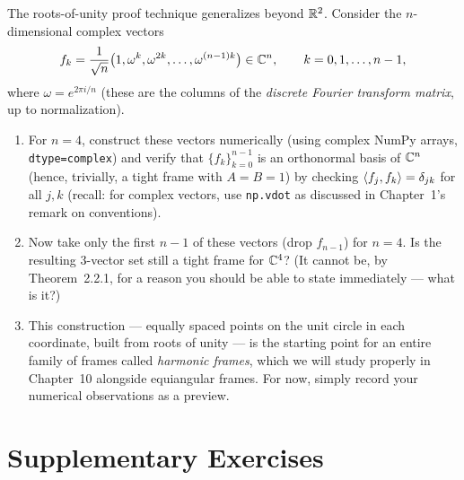 \begin{exercisebox}[title={Lab Exercise 4.5 (Optional, Challenge): Roots of Unity in $\C^n$}]
The roots-of-unity proof technique generalizes beyond $\mathbb{R}^2$. Consider
the $n$-dimensional complex vectors
\[
  f_k = \frac{1}{\sqrt{n}}\bigl(1, \omega^k, \omega^{2k}, \ldots, \omega^{(n-1)k}\bigr) \in \mathbb{C}^n,
  \qquad k = 0, 1, \ldots, n-1,
\]
where $\omega = e^{2\pi i/n}$ (these are the columns of the
\emph{discrete Fourier transform matrix}, up to normalization).
\begin{enumerate}[label=(\alph*)]
  \item For $n=4$, construct these vectors numerically (using complex
        NumPy arrays, \texttt{dtype=complex}) and verify that
        $\{f_k\}_{k=0}^{n-1}$ is an orthonormal basis of $\C^n$ (hence,
        trivially, a tight frame with $A=B=1$) by checking
        $\left\langle f_j, f_k \right\rangle=\delta_{jk}$ for all $j,k$ (recall: for
        complex vectors, use \texttt{np.vdot} as discussed in
        Chapter~1's remark on conventions).
  \item Now take only the first $n-1$ of these vectors (drop $f_{n-1}$)
        for $n=4$. Is the resulting $3$-vector set still a tight frame
        for $\mathbb{C}^4$? (It cannot be, by Theorem~2.2.1, for a reason you
        should be able to state immediately --- what is it?)
  \item This construction --- equally spaced points on the unit circle
        in each coordinate, built from roots of unity --- is the
        starting point for an entire family of frames called
        \emph{harmonic frames}, which we will study properly in
        Chapter~10 alongside equiangular frames. For now, simply record
        your numerical observations as a preview.
\end{enumerate}
\end{exercisebox}

\newpage
\section{Supplementary Exercises}
\label{sec:extra-ch4}

